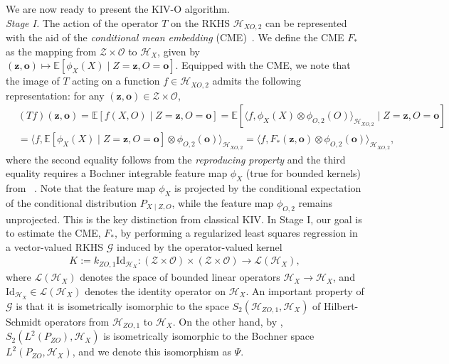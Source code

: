 \documentclass[11pt]{article}
\newcommand{\bz}{\mathbf z}
\newcommand{\bo}{\mathbf o}
\newcommand{\calZ}{\mathcal{Z}}
\newcommand{\calH}{\mathcal{H}}
\newcommand{\calG}{\mathcal{G}}
\newcommand{\calO}{\mathcal{O}}
\newcommand{\calL}{\mathcal{L}}
\newcommand{\0}{\mathbf{0}}
\def\Id{\mathrm{Id}}
\begin{document}
\vspace{1mm}
We are now ready to present the KIV-O algorithm. \\  
\indent \textit{Stage I.} The action of the operator $T$ on the RKHS $\calH_{XO,2}$ can be represented with the aid of the \emph{conditional mean embedding} (CME)~\citep{song2009hilbert, park2021measuretheoreticapproachkernelconditional, klebanov2020rigorous, lietal2022optimal}. We define the CME $F_{\ast}$ as the mapping from $\calZ\times \calO$ to $\calH_{X}$, given by $(\bz,\bo)\mapsto \mathbb{E}[\phi_{X}(X)\mid Z = \bz,O = \bo]$. Equipped with the CME, we note that the image of $T$ acting on a function $f\in \calH_{XO,2}$ admits the following representation: for any $(\bz,\bo)\in \calZ\times \calO$,
\begin{align*}
    &(Tf)(\bz,\bo) = \mathbb{E}[f(X,O)\mid Z=\bz, O = \bo] = \mathbb{E}[\langle f, \phi_{X}(X) \otimes \phi_{O,2}(O)\rangle_{\calH_{XO,2}} \mid Z = \bz, O = \bo]\\
    &= \langle f, \mathbb{E}[\phi_{X}(X)\mid Z = \bz, O = \bo]\otimes \phi_{O,2}(\bo)\rangle_{\calH_{XO,2}} = \langle f, F_{\ast}(\bz,\bo)\otimes \phi_{O,2}(\bo)\rangle_{\calH_{XO,2}},
\end{align*}
where the second equality follows from the \emph{reproducing property} and the third equality requires a Bochner integrable feature map $\phi_X$ (true for bounded kernels) from ~\citep[Definition A.5.20]{steinwart2008support}. 
Note that the feature map $\phi_{X}$ is projected by the conditional expectation of the conditional distribution $P_{X\mid Z,O}$, while the feature map $\phi_{O,2}$ remains unprojected. This is the key distinction from classical KIV. 
In Stage I, our goal is to estimate the CME, $F_{\ast}$, by performing a regularized least squares regression in a vector-valued RKHS $\calG$ induced by the operator-valued kernel ~\citep{grunewalder2012conditional, lietal2022optimal} 
\begin{align}
\label{eq:op_val_kernel}
    K := k_{ZO,1}\Id_{\calH_X} : (\calZ\times \calO)\times (\calZ\times \calO)\to \calL(\calH_{X}),
\end{align}
where $\calL(\calH_{X})$ denotes the space of bounded linear operators $\calH_{X}\to \calH_{X}$, and $\mathrm{Id}_{\calH_{X}}\in \calL(\calH_{X})$ denotes the identity operator on $\calH_{X}$. 
An important property of $\calG$ is that it is isometrically isomorphic to the space $S_2(\mathcal{H}_{Z O, 1}, \mathcal{H}_X)$ of Hilbert-Schmidt operators from $\mathcal{H}_{Z O, 1}$ to $\mathcal{H}_X$. On the other hand, by \citet[Theorem 12.6.1]{aubin2011applied}, $S_2(L^2(P_{ZO}), \calH_X)$ is isometrically isomorphic to the Bochner space $L^2(P_{ZO}, \calH_X)$, and we denote this isomorphism as $\Psi$. 
\end{document}
